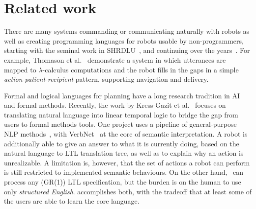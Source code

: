 \section{Related work}

There are many systems commanding or communicating naturally with robots as well as creating programming
languages for robots usable by non-programmers, starting with the seminal work in SHRDLU~\cite{shrdlu},
and continuing over the years~\cite{kollarDialog,thomasonDialog,roboFlow}.
For example, Thomason et al.~\cite{thomasonDialog} demonstrate a system in which
utterances are mapped to $\lambda$-calculus computations and the robot 
fills in the gaps in a simple \textit{action-patient-recipient} pattern, supporting
navigation and delivery.
%

Formal and logical languages for planning have a long research tradition in AI and formal methods.
Recently, the work by Kress-Gazit et
al.~\cite{hadasTranslatingStructuredEnglish,hadasLTLMop,
hadasProvablyCorrectReactiveControlFromNaturalLanguage} focuses on translating
natural language into linear temporal logic to bridge the gap from users to formal methods
tools.
One project uses a pipeline of general-purpose NLP 
methods~\cite{hadasProvablyCorrectReactiveControlFromNaturalLanguage}, with VerbNet~\cite{schulerVerbnet}
at the core of semantic interpretation. A robot is additionally able
to give an answer to what it is currently doing, based on the natural language
to LTL translation tree, as well as to explain why an action is unrealizable. A
limitation is, however, that the set of actions a robot can perform is still
restricted to implemented semantic behaviours. On the other hand,~\cite{hadasTranslatingStructuredEnglish}
can process any (GR(1)) LTL specification, but the burden is on the human to use
only \emph{structured English}. \tool accomplishes both, with the tradeoff 
that at least some of the users are able to learn the core language.


